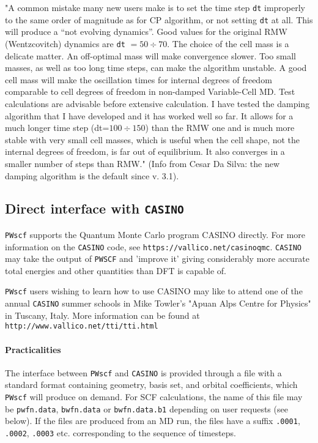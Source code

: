 \documentclass[12pt,a4paper]{article}
\begin{document}
"A common mistake many new users make is to set the time step \texttt{dt}
improperly to the same order of magnitude as for CP algorithm, or
not setting \texttt{dt} at all. This will produce a ``not evolving dynamics''.
Good values for the original RMW (Wentzcovitch) dynamics are 
\texttt{dt} $ = 50 \div 70$. The choice of the cell mass is a
delicate matter. An
off-optimal mass will make convergence slower. Too small masses, as
well as too long time steps, can make the algorithm unstable. A good
cell mass will make the oscillation times for internal degrees of
freedom comparable to cell degrees of freedom in non-damped
Variable-Cell MD. Test calculations are advisable before extensive
calculation. I have tested the damping algorithm that I have developed
and it has worked well so far. It allows for a much longer time step
(dt=$100 \div 150$) than the RMW one and is much more stable with very
small cell masses, which is useful when the cell shape, not the
internal degrees of freedom, is far out of equilibrium. It also
converges in a smaller number of steps than RMW." (Info from Cesar Da
Silva: the new damping algorithm is the default since v. 3.1).

\subsection{Direct interface with \texttt{CASINO}} \label{pw2casino_info}

\texttt{PWscf} supports the Quantum Monte Carlo program CASINO directly.
For more information on the \texttt{CASINO} code,
see \texttt{https://vallico.net/casinoqmc}. 
\texttt{CASINO} may take the output of \texttt{PWSCF} and
'improve it' giving considerably more accurate total energies and other
quantities than DFT is capable of.


\texttt{PWscf} users wishing to learn how to use CASINO may like to attend one
of the annual \texttt{CASINO} summer schools in Mike Towler's "Apuan Alps Centre
for Physics" in Tuscany, Italy. More information can be found at \texttt{http://www.vallico.net/tti/tti.html} 
\paragraph{Practicalities}
The interface between \texttt{PWscf} and \texttt{CASINO} is provided through a file with a
standard format containing geometry, basis set, and orbital coefficients, which
\texttt{PWscf} will produce on demand. For SCF calculations, the name of this file may
be \texttt{pwfn.data}, \texttt{bwfn.data} or \texttt{bwfn.data.b1} depending on user requests (see below).
If the files are produced from an MD run, the files have a suffix \texttt{.0001}, \texttt{.0002},
\texttt{.0003} etc.  corresponding to the sequence of timesteps.
\end{document}
